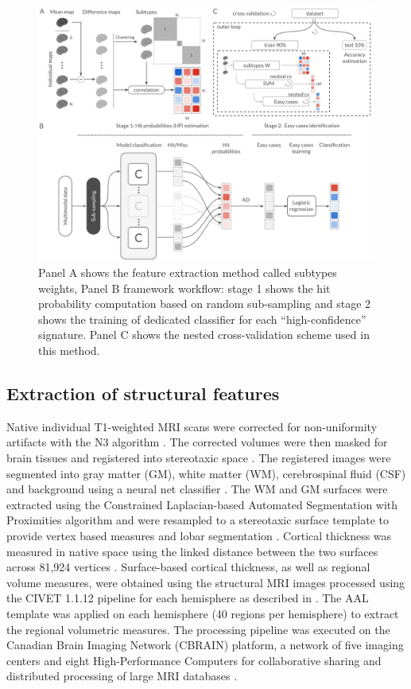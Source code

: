 \documentclass[authoryear]{elsarticle}
\begin{document}
\begin{figure}[htbp]
\centering
\includegraphics[width=\linewidth]{figures/methods.png}
\caption{Panel A shows the feature extraction method called subtypes weights, Panel B framework workflow: stage 1 shows the hit probability computation based on random sub-sampling and stage 2 shows the training of dedicated classifier for each “high-confidence” signature. Panel C shows the nested cross-validation scheme used in this method.}
\label{fig_methods}
\end{figure}

\subsection*{Extraction of structural features}
Native individual T1-weighted MRI scans were corrected for non-uniformity artifacts with the N3 algorithm \citep{Sled1998}. The corrected volumes were then masked for brain tissues \citep{Smith2002} and registered into stereotaxic space \citep{Collins1994}. The registered images were segmented into gray matter (GM), white matter (WM), cerebrospinal fluid (CSF) and background using a neural net classifier \citep{Tohka2004}. The WM and GM surfaces were extracted using the Constrained Laplacian-based Automated Segmentation with Proximities algorithm \citep{Kim2005,Macdonald2000} and were resampled to a stereotaxic surface template to provide vertex based measures and lobar segmentation \citep{Lyttelton2007}. Cortical thickness was measured in native space using the linked distance between the two surfaces across 81,924 vertices \citep{Im2008}. Surface-based cortical thickness, as well as regional volume measures,  were obtained using the structural MRI images processed using the CIVET 1.1.12 pipeline for each hemisphere as described in \cite{Ad-Dabbagh2006}. The AAL template was applied on each hemisphere (40 regions per hemisphere) to extract the regional volumetric measures. The processing pipeline was executed on the Canadian Brain Imaging Network (CBRAIN) platform, a network of five imaging centers and eight High-Performance Computers for collaborative sharing and distributed processing of large MRI databases \citep{Frisoni2011}.
\end{document}

